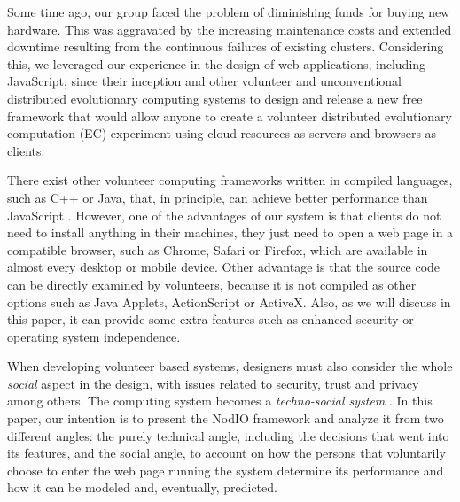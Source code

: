 \documentclass[journal,onecolumn]{IEEEtran}
\begin{document}
Some time ago, our group faced the problem of diminishing funds for
buying new hardware. This was aggravated by the increasing maintenance costs and
extended downtime resulting from the continuous failures of existing
clusters.
Considering this, we leveraged 
our experience in the design of web
applications, including JavaScript, since their inception and other
volunteer and
unconventional distributed evolutionary computing systems to 
design and release a new free framework that would allow anyone to
create a volunteer distributed evolutionary computation (EC) experiment using cloud resources as
servers and browsers as clients.

There exist other volunteer computing frameworks written in compiled languages,
such as C++ or Java, that, in principle, can achieve better performance than
JavaScript \cite{2015arXiv151101088M}. However, one of the advantages of our system is that
clients do not need to install anything in their machines, they just
need to open a web page  
in a compatible browser, such as Chrome, Safari or Firefox, which are
available in almost every desktop or mobile device. Other advantage is
that the source code can be directly examined by volunteers, because it is not
compiled as other options such as Java Applets, ActionScript or
ActiveX.
Also, as we will discuss in this paper, it can provide some extra
features such as enhanced security or operating system independence. 


When developing volunteer based systems, designers must
also consider the whole {\em social} aspect in the design, with
issues related to security, trust and privacy among others. 
The computing system becomes a {\em techno-social system} \cite{vespignani2009predicting}.  
In this paper, our intention is to
present the {\sf NodIO} framework and analyze it from two different
angles: the purely technical angle, including the decisions that went
into its features, and the social angle, to account on how the persons
that voluntarily choose to enter the web page running the system
determine its performance and how it can be modeled and, eventually,
predicted.
\end{document}
